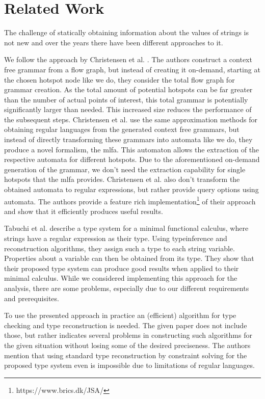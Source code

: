 \chapter{Related Work}
\label{chapter:RelatedWork}

The challenge of statically obtaining information about the values of strings is not new and over the years there have been different approaches to it.

We follow the approach by Christensen et al. \cite{brics}. The authors construct a context free grammar from a flow graph, but instead of creating it on-demand, starting at the chosen hotspot node like we do, they consider the total flow graph for grammar creation.
As the total amount of potential hotspots can be far greater than the number of actual points of interest, this total grammar is potentially significantly larger than needed. This increased size reduces the performance of the subsequent steps.
Christensen et al. use the same approximation methods for obtaining regular languages from the generated context free grammars, but instead of directly transforming these grammars into automata like we do, they produce a novel formalism, the \ac{mlfa}.
This automaton allows the extraction of the respective automata for different hotspots. Due to the aforementioned on-demand generation of the grammar, we don't need the extraction capability for single hotspots that the \ac{mlfa} provides. Christensen et al. also don't transform the obtained automata to regular expressions, but rather provide query options using automata.
The authors provide a feature rich implementation\footnote{https://www.brics.dk/JSA/} of their approach and show that it efficiently produces useful results.


Tabuchi et al. \cite{regex_types} describe a type system for a minimal functional calculus, where strings have a regular expression as their type. Using typeinference and reconstruction algorithms, they assign such a type to each string variable. Properties about a variable can then be obtained from its type.
They show that their proposed type system can produce good results when applied to their minimal calculus. While we considered implementing this approach for the analysis, there are some problems, especially due to our different requirements and prerequisites.

To use the presented approach in practice an (efficient) algorithm for type checking and type reconstruction is needed. 
The given paper does not include those, but rather indicates several problems in constructing such algorithms for the given situation without losing some of the desired preciseness.
The authors mention that using standard type reconstruction by constraint solving for the proposed type system even is impossible due to limitations of regular languages.

